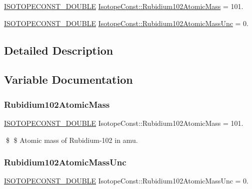 \begin{DoxyCompactItemize}
\item 
\mbox{\hyperlink{group___isotope_const-_macros_ga8f45a7272ce02c0b4c65c44636ed719a}{I\+S\+O\+T\+O\+P\+E\+C\+O\+N\+S\+T\+\_\+\+D\+O\+U\+B\+LE}} \mbox{\hyperlink{group___isotope_const-_rubidium-_rb102_ga3cbc6b0346e990399715653db408531a}{Isotope\+Const\+::\+Rubidium102\+Atomic\+Mass}} = 101.
\item 
\mbox{\hyperlink{group___isotope_const-_macros_ga8f45a7272ce02c0b4c65c44636ed719a}{I\+S\+O\+T\+O\+P\+E\+C\+O\+N\+S\+T\+\_\+\+D\+O\+U\+B\+LE}} \mbox{\hyperlink{group___isotope_const-_rubidium-_rb102_gaa69507d4b51c787a7592608609f034db}{Isotope\+Const\+::\+Rubidium102\+Atomic\+Mass\+Unc}} = 0.
\end{DoxyCompactItemize}


\subsection{Detailed Description}


\subsection{Variable Documentation}
\mbox{\label{group___isotope_const-_rubidium-_rb102_ga3cbc6b0346e990399715653db408531a}} 
\subsubsection{\texorpdfstring{Rubidium102\+Atomic\+Mass}{Rubidium102AtomicMass}}
{\footnotesize\ttfamily \mbox{\hyperlink{group___isotope_const-_macros_ga8f45a7272ce02c0b4c65c44636ed719a}{I\+S\+O\+T\+O\+P\+E\+C\+O\+N\+S\+T\+\_\+\+D\+O\+U\+B\+LE}} Isotope\+Const\+::\+Rubidium102\+Atomic\+Mass = 101.}

\$ \$ Atomic mass of Rubidium-\/102 in amu. \mbox{\label{group___isotope_const-_rubidium-_rb102_gaa69507d4b51c787a7592608609f034db}} 
\subsubsection{\texorpdfstring{Rubidium102\+Atomic\+Mass\+Unc}{Rubidium102AtomicMassUnc}}
{\footnotesize\ttfamily \mbox{\hyperlink{group___isotope_const-_macros_ga8f45a7272ce02c0b4c65c44636ed719a}{I\+S\+O\+T\+O\+P\+E\+C\+O\+N\+S\+T\+\_\+\+D\+O\+U\+B\+LE}} Isotope\+Const\+::\+Rubidium102\+Atomic\+Mass\+Unc = 0.}

